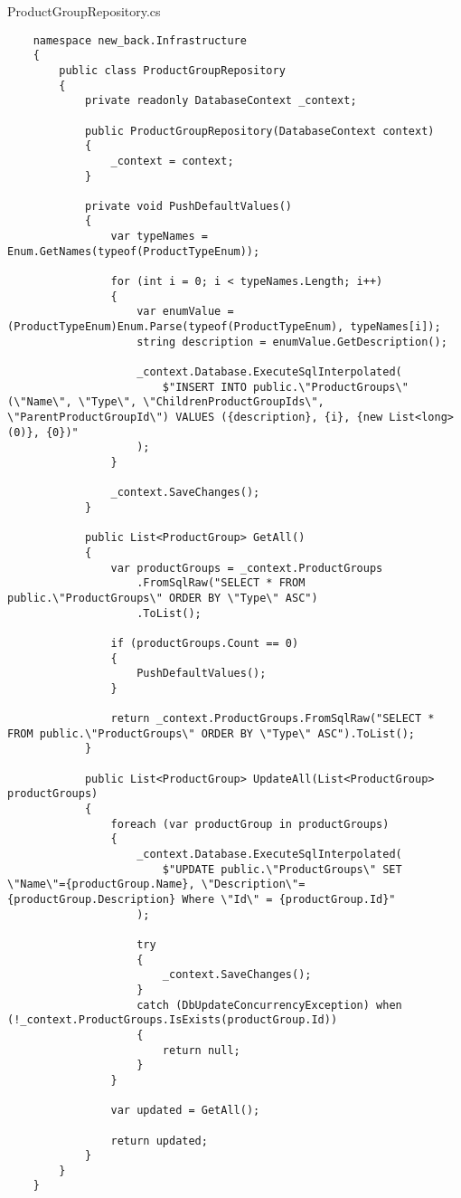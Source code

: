 ProductGroupRepository.cs
\lstset{style=sharpc}
\begin{lstlisting}
    namespace new_back.Infrastructure
    {
        public class ProductGroupRepository
        {
            private readonly DatabaseContext _context;
            
            public ProductGroupRepository(DatabaseContext context)
            {
                _context = context;
            }
    
            private void PushDefaultValues()
            {
                var typeNames = Enum.GetNames(typeof(ProductTypeEnum));
    
                for (int i = 0; i < typeNames.Length; i++)
                {
                    var enumValue = (ProductTypeEnum)Enum.Parse(typeof(ProductTypeEnum), typeNames[i]);
                    string description = enumValue.GetDescription();
    
                    _context.Database.ExecuteSqlInterpolated(
                        $"INSERT INTO public.\"ProductGroups\"(\"Name\", \"Type\", \"ChildrenProductGroupIds\", \"ParentProductGroupId\") VALUES ({description}, {i}, {new List<long>(0)}, {0})"
                    );
                }
                
                _context.SaveChanges();
            }
            
            public List<ProductGroup> GetAll()
            {
                var productGroups = _context.ProductGroups
                    .FromSqlRaw("SELECT * FROM public.\"ProductGroups\" ORDER BY \"Type\" ASC")
                    .ToList();
    
                if (productGroups.Count == 0)
                {
                    PushDefaultValues();
                }
                
                return _context.ProductGroups.FromSqlRaw("SELECT * FROM public.\"ProductGroups\" ORDER BY \"Type\" ASC").ToList();
            }
            
            public List<ProductGroup> UpdateAll(List<ProductGroup> productGroups)
            {
                foreach (var productGroup in productGroups)
                {
                    _context.Database.ExecuteSqlInterpolated(
                        $"UPDATE public.\"ProductGroups\" SET \"Name\"={productGroup.Name}, \"Description\"={productGroup.Description} Where \"Id\" = {productGroup.Id}"
                    );
                    
                    try
                    {
                        _context.SaveChanges();
                    }
                    catch (DbUpdateConcurrencyException) when (!_context.ProductGroups.IsExists(productGroup.Id))
                    {
                        return null;
                    }
                }
    
                var updated = GetAll();
    
                return updated;
            }
        }
    }
\end{lstlisting}

